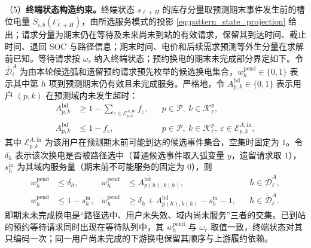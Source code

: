 \documentclass[12pt,a4paper,UTF8]{ctexart}
\begin{document}
（5）\textbf{终端状态构造约束。}终端状态 $s_{\ell+H}$ 的库存分量取预测期末事件发生前的槽位电量 $S_{i,b}(t_{\ell+H}^{-})$，由所选服务模式的投影 \eqref{eq:pattern_state_projection} 给出；请求分量为期末仍在等待及未来尚未到站的有效请求，保留其到达时间、截止时间、退回 SOC 与路径信息；期末时间、电价和后续需求预测等外生分量在求解前已知。等待请求按 $\omega_r$ 纳入终端状态；预约换电的期末未完成部分界定如下。令 $\overline{\mathcal D}_{\ell}^{A}$ 为由本轮候选弧和遗留预约请求预先枚举的候选换电集合，$w_h^{\mathrm{pend}}\in\{0,1\}$ 表示其中第 $h$ 项到预测期末仍有效且未完成服务。严格地，令 $A_{p,k}^{\mathrm{bd}}\in\{0,1\}$ 表示用户 $(p,k)$ 在预测域内未发生超时：
\begin{subequations}
\label{eq:boundary_alive}
\begin{align}
A_{p,k}^{\mathrm{bd}}
&\ge 1-\sum_{\varepsilon\in\mathcal E_{p,k}^{A,\mathrm{in}}}
f_\varepsilon,
&&p\in\mathcal P,\ k\in\mathcal K_\ell^p,\\
A_{p,k}^{\mathrm{bd}}
&\le 1-f_\varepsilon,
&&p\in\mathcal P,\ k\in\mathcal K_\ell^p,\ \varepsilon\in\mathcal E_{p,k}^{A,\mathrm{in}},
\end{align}
\end{subequations}
其中 $\mathcal E_{p,k}^{A,\mathrm{in}}$ 为该用户在预测期末前可能到达的候选事件集合，空集时固定为 $1$。令 $\delta_h$ 表示该次换电是否被路径选中（普通候选事件取入弧变量 $y$，遗留请求取 $1$），$s_h^{\mathrm{in}}$ 为其域内服务量（期末前不可能服务的固定为 $0$），则
\begin{subequations}
\label{eq:pending_delivery_alive}
\begin{align}
w_h^{\mathrm{pend}}&\le\delta_h,&
w_h^{\mathrm{pend}}&\le A_{p(h),k(h)}^{\mathrm{bd}},
&&h\in\overline{\mathcal D}_{\ell}^{A},\\
w_h^{\mathrm{pend}}&\le1-s_h^{\mathrm{in}},&
w_h^{\mathrm{pend}}
&\ge\delta_h+A_{p(h),k(h)}^{\mathrm{bd}}
-s_h^{\mathrm{in}}-1,
&&h\in\overline{\mathcal D}_{\ell}^{A}.
\end{align}
\end{subequations}
即期末未完成换电是“路径选中、用户未失效、域内尚未服务”三者的交集。已到站的预约等待请求同时出现在等待队列中，其 $w_h^{\mathrm{pend}}$ 与 $\omega_r$ 取值一致，终端状态对其只编码一次；同一用户尚未完成的下游换电保留其顺序与上游履约依赖。
\end{document}
